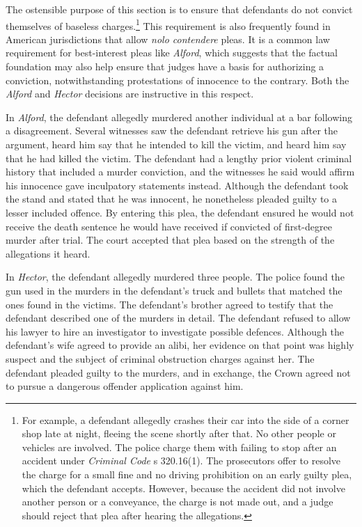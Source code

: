 The ostensible purpose of this section is to ensure that defendants do not convict themselves of baseless charges.\footnote{For example, a defendant allegedly crashes their car into the side of a corner shop late at night, fleeing the scene shortly after that. No other people or vehicles are involved. The police charge them with failing to stop after an accident under \textit{Criminal Code} s 320.16(1). The prosecutors offer to resolve the charge for a small fine and no driving prohibition on an early guilty plea, which the defendant accepts. However, because the accident did not involve another person or a conveyance, the charge is not made out, and a judge should reject that plea after hearing the allegations.} This requirement is also frequently found in American jurisdictions that allow \textit{nolo contendere} pleas. It is a common law requirement for best-interest pleas like \textit{Alford}, which suggests that the factual foundation may also help ensure that judges have a basis for authorizing a conviction, notwithstanding protestations of innocence to the contrary. Both the \textit{Alford} and \textit{Hector} decisions are instructive in this respect.

In \textit{Alford}, the defendant allegedly murdered another individual at a bar following a disagreement. Several witnesses saw the defendant retrieve his gun after the argument, heard him say that he intended to kill the victim, and heard him say that he had killed the victim. The defendant had a lengthy prior violent criminal history that included a murder conviction, and the witnesses he said would affirm his innocence gave inculpatory statements instead. Although the defendant took the stand and stated that he was innocent, he nonetheless pleaded guilty to a lesser included offence. By entering this plea, the defendant ensured he would not receive the death sentence he would have received if convicted of first-degree murder after trial. The court accepted that plea based on the strength of the allegations it heard.

In \textit{Hector}, the defendant allegedly murdered three people. The police found the gun used in the murders in the defendant's truck and bullets that matched the ones found in the victims. The defendant's brother agreed to testify that the defendant described one of the murders in detail. The defendant refused to allow his lawyer to hire an investigator to investigate possible defences. Although the defendant's wife agreed to provide an alibi, her evidence on that point was highly suspect and the subject of criminal obstruction charges against her. The defendant pleaded guilty to the murders, and in exchange, the Crown agreed not to pursue a dangerous offender application against him.

